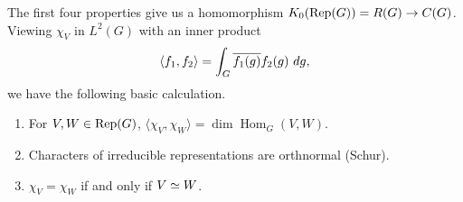 The first four properties give us a homomorphism
$K_0(\mathrm{Rep}(G)) = R(G) \rightarrow C(G)$. Viewing $\chi_V$ in $L^2(G)$ with an
inner product
\[ \langle f_1, f_2 \rangle = \int_G \overline{f_1(g)} f_2(g) \ dg, \]
we have the following basic calculation.

\begin{prop}
\begin{enumerate}[(1)]
\item For $V, W \in \mathrm{Rep}(G)$,
$\langle \chi_V, \chi_W \rangle = \dim \operatorname{Hom}_G (V, W).$
\item Characters of irreducible representations are orthnormal (Schur).
\item $\chi_V = \chi_W$ if and only if $V \simeq W$.
\end{enumerate}
\end{prop}
